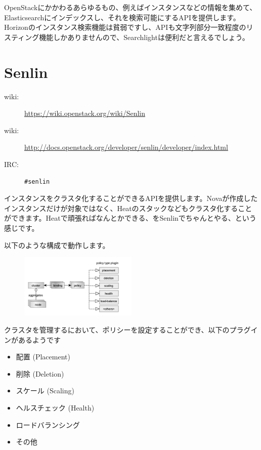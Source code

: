 OpenStackにかかわるあらゆるもの、例えばインスタンスなどの情報を集めて、Elasticsearchにインデックスし、それを検索可能にするAPIを提供します。Horizonのインスタンス検索機能は貧弱ですし、APIも文字列部分一致程度のリスティング機能しかありませんので、Searchlightは便利だと言えるでしょう。

\section{Senlin}

\begin{description}
	\item[wiki:] \url{https://wiki.openstack.org/wiki/Senlin}
	\item[wiki:] \url{http://docs.openstack.org/developer/senlin/developer/index.html}
	\item[IRC:] \verb|#senlin|
\end{description}

インスタンスをクラスタ化することができるAPIを提供します。Novaが作成したインスタンスだけが対象ではなく、Heatのスタックなどもクラスタ化することができます。Heatで頑張ればなんとかできる、をSenlinでちゃんとやる、という感じです。

以下のような構成で動作します。

\begin{figure}
	\vspace*{-2\intextsep}
	\begin{center}
		\includegraphics[width=0.5\textwidth]{img/Senlin-policies.png}
	\end{center}
\end{figure}

クラスタを管理するにおいて、ポリシーを設定することができ、以下のプラグインがあるようです

\begin{itemize}
	\item 配置 (Placement)
	\item 削除 (Deletion)
	\item スケール (Scaling)
	\item ヘルスチェック (Health)
	\item ロードバランシング
	\item その他
\end{itemize}

